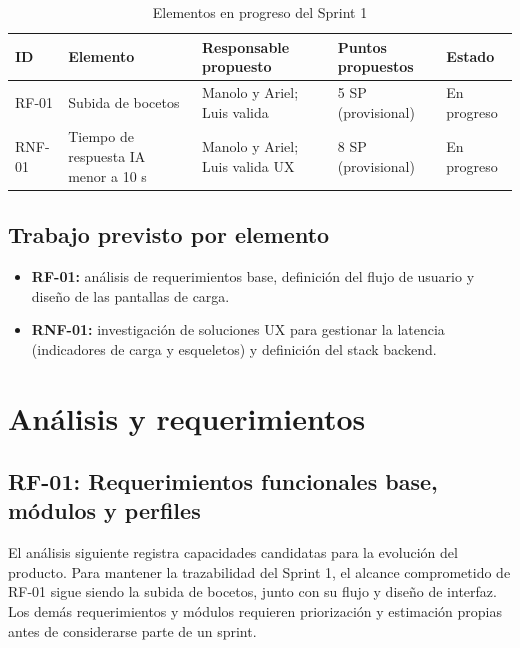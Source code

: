 \documentclass[12pt,a4paper]{article}
\begin{document}
\begin{table}[htbp]
    \centering
    \caption{Elementos en progreso del Sprint 1}
    \label{tab:sprint-backlog}
    \begin{tabularx}{\textwidth}{L{1.5cm}Y L{2.3cm} L{1.7cm} L{1.8cm}}
        \toprule
        \textbf{ID} & \textbf{Elemento} & \textbf{Responsable propuesto} & \textbf{Puntos propuestos} & \textbf{Estado} \\
        \midrule
        RF-01 & Subida de bocetos & Manolo y Ariel; Luis valida & 5 SP (provisional) & En progreso \\
        RNF-01 & Tiempo de respuesta IA menor a 10 s & Manolo y Ariel; Luis valida UX & 8 SP (provisional) & En progreso \\
        \bottomrule
    \end{tabularx}
\end{table}

\subsection{Trabajo previsto por elemento}

\begin{itemize}
    \item \textbf{RF-01:} análisis de requerimientos base, definición del flujo de usuario y diseño de las pantallas de carga.
    \item \textbf{RNF-01:} investigación de soluciones UX para gestionar la latencia (indicadores de carga y esqueletos) y definición del stack backend.
\end{itemize}

\section{Análisis y requerimientos}

\subsection{RF-01: Requerimientos funcionales base, módulos y perfiles}

El análisis siguiente registra capacidades candidatas para la evolución del producto.
Para mantener la trazabilidad del Sprint 1, el alcance comprometido de RF-01 sigue
siendo la subida de bocetos, junto con su flujo y diseño de interfaz. Los demás
requerimientos y módulos requieren priorización y estimación propias antes de
considerarse parte de un sprint.
\end{document}

